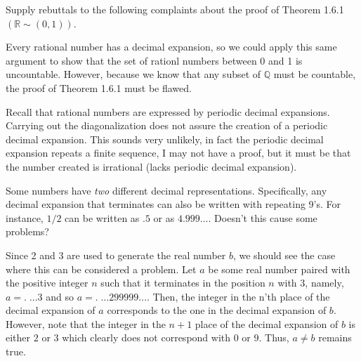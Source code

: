 \documentclass[12pt]{article}
\newcommand{\R}{\mathbb{R}}
\newcommand{\Q}{\mathbb{Q}}
\newenvironment{problem}[2][Problem]{\begin{trivlist} \item[\hskip \labelsep {\bfseries #1}\hskip \labelsep {\bfseries #2.}]}{\end{trivlist}}
\newenvironment{solution}[2][Solution]{\begin{trivlist} \item[\hskip \labelsep {\bfseries #1}\hskip \labelsep {\bfseries #2.}]}{\end{trivlist}}
\begin{document}
\begin{problem}{1.6.3}
  Supply rebuttals to the following complaints about the proof of Theorem 1.6.1 $(\R\sim  (0,1))$.
  \begin{enumerate}[label=(\alph*)]
    \item Every rational number has a decimal expansion, so we could apply this same argument to show that the set of rationl numbers between 0 and 1 is uncountable. However, because we know that any subset of $\Q$ must be countable, the proof of Theorem 1.6.1 must be flawed.
      \begin{solution}{(a)}
	Recall that rational numbers are expressed by periodic decimal expansions. Carrying out the diagonalization does not assure the creation of a periodic decimal expansion. This sounds very unlikely, in fact the periodic decimal expansion repeats a finite sequence, I may not have a proof, but it must be that the number created is irrational (lacks periodic decimal expansion).  
      \end{solution}

    \item Some numbers have \textit{two} different decimal representations. Specifically, any decimal expansion that terminates can also be written with repeating 9's. For instance, $1/2$ can be written as $.5$ or as $4.999\dots$. Doesn't this cause some problems?
      \begin{solution}{(b)}
	Since 2 and 3 are used to generate the real number $b$, we should see the case where this can be considered a problem. Let $a$ be some real number paired with the positive integer $n$ such that it terminates in the position $n$ with $3$, namely, $a=.\; \dots3$ and so $a=.\; \dots299999\dots$. Then, the integer in the n'th place of the decimal expansion of $a$ corresponds to the one in the decimal expansion of $b$. However, note that the integer in the $n+1$ place of the decimal expansion of $b$ is either $2$ or $3$ which clearly does not correspond with $0$ or $9$. Thus, $a\neq b$ remains true. 
      \end{solution}
  \end{enumerate}
\end{problem}
\end{document}
